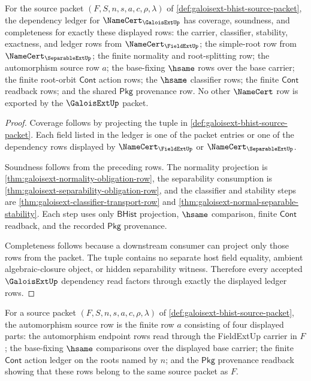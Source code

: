 \begin{theorem}
\label{thm:galoisext-dependency-exactness-ledger}
For the source packet $(F,S,n,s,a,c,\rho,\lambda)$ of
\autoref{def:galoisext-bhist-source-packet}, the dependency ledger for
$\NameCert_{\GaloisExtUp}$ has coverage, soundness, and completeness for
exactly these displayed rows: the carrier, classifier, stability, exactness,
and ledger rows from $\NameCert_{\FieldExtUp}$; the simple-root row from
$\NameCert_{\SeparableExtUp}$; the finite normality and root-splitting row;
the automorphism source row $a$; the base-fixing $\hsame$ rows over the base
carrier; the finite root-orbit $\mathsf{Cont}$ action rows; the $\hsame$
classifier rows; the finite $\mathsf{Cont}$ readback rows; and the shared
$\mathsf{Pkg}$ provenance row. No other $\NameCert$ row is exported by the
$\GaloisExtUp$ packet.
\end{theorem}
\begin{proof}
Coverage follows by projecting the tuple in
\autoref{def:galoisext-bhist-source-packet}. Each field listed in the ledger
is one of the packet entries or one of the dependency rows displayed by
$\NameCert_{\FieldExtUp}$ or $\NameCert_{\SeparableExtUp}$.

Soundness follows from the preceding rows. The normality projection is
\autoref{thm:galoisext-normality-obligation-row}, the separability consumption
is \autoref{thm:galoisext-separability-obligation-row}, and the classifier and
stability steps are \autoref{thm:galoisext-classifier-transport-row} and
\autoref{thm:galoisext-normal-separable-stability}. Each step uses only
$\mathsf{BHist}$ projection, $\hsame$ comparison, finite $\mathsf{Cont}$
readback, and the recorded $\mathsf{Pkg}$ provenance.

Completeness follows because a downstream consumer can project only those rows
from the packet. The tuple contains no separate host field equality, ambient
algebraic-closure object, or hidden separability witness. Therefore every
accepted $\GaloisExtUp$ dependency read factors through exactly the displayed
ledger rows.
\end{proof}

\begin{definition}
\label{def:galoisext-automorphism-source-row}
For a source packet $(F,S,n,s,a,c,\rho,\lambda)$ of
\autoref{def:galoisext-bhist-source-packet}, the automorphism source row is
the finite row $a$ consisting of four displayed parts: the automorphism
endpoint rows read through the FieldExtUp carrier in $F$; the base-fixing
$\hsame$ comparisons over the displayed base carrier; the finite
$\mathsf{Cont}$ action ledger on the roots named by $n$; and the
$\mathsf{Pkg}$ provenance readback showing that these rows belong to the same
source packet as $F$.
\end{definition}

